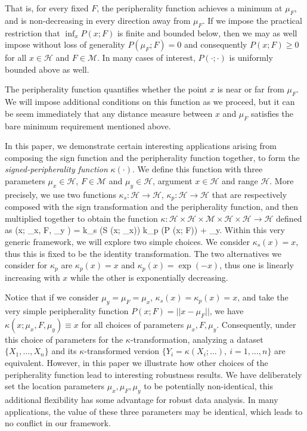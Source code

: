 \documentclass[12pt,letterpaper]{article}
\newcommand{\cH}{\mathcal{H}}
\newcommand{\cM}{\mathcal{M}}
\def\ban#1\ean{\begin{align*}#1\end{align*}}
\theoremstyle{Example}
\begin{document}
That is, for every fixed $F$, the peripherality function achieves a minimum at 
$\mu_{F}$, and is non-decreasing in every direction away from $\mu_{F}$. If 
we impose the practical restriction that $\inf_{x} P ( x ; F )$ is finite and 
bounded below, then we may as well impose without loss of generality 
$P ( \mu_{F} ; F ) = 0$ and consequently $P ( x ; F ) \geq 0$ for all $x \in \cH$ 
and  $F \in \cM$. In many cases of interest, $P ( \cdot; \cdot)$ is 
uniformly bounded above as well.


The peripherality function quantifies whether the point $x$ is near or far from $\mu_{F}$. 
We will impose additional conditions on this function 
as we proceed, but it can be seem immediately that any distance measure between 
$x$ and $\mu_{F}$ satisfies the bare minimum requirement mentioned above. 


In this paper, we demonstrate certain interesting applications arising from 
composing the sign function and the peripherality function together, to form the 
{\it signed-peripherality function} $\kappa (\cdot)$. We define this function 
with three parameters $\mu_{x} \in \cH$, $F \in \cM$ and  
$\mu_{y} \in \cH$,  argument $x \in \cH$ and range $\cH$. More precisely,
we use two functions $\kappa_{s} : \cH \rightarrow \cH$, 
$\kappa_{p} : \cH \rightarrow \cH$ that are respectively 
composed with the sign transformation and the peripherality function, and 
then multiplied together to obtain the function
$\kappa : \cH \times \cH \times \cM \times \cH \times \cH \rightarrow \cH$ 
defined as 
\ban 
\kappa (x; \mu_{x}, F, \mu_{y} ) = k_{s} (S (x; \mu_{x})) k_{p} (P (x; F)) + \mu_{y}. 
\ean
Within this very generic framework, we will explore two simple choices. We consider 
$\kappa_{s} (x) = x$, thus this is fixed to be the identity transformation. The two 
alternatives we consider for $\kappa_{p}$ are 
$\kappa_{p} (x) = x$ and $\kappa_{p} (x) = \exp (- x)$, thus one is linearly 
increasing with $x$ while the other is exponentially decreasing.


Notice that if we consider $\mu_{y} = \mu_{F} = \mu_{x}$,  
$\kappa_{s} (x) = \kappa_{p} (x) = x$, and take the very 
simple peripherality  function $P( x; F) = || x - \mu_{F} ||$, we have 
$\kappa (x; \mu_{x}, F, \mu_{y} ) \equiv x$ for all choices of parameters 
$\mu_{x}, F, \mu_{y}$.  Consequently, under this choice of parameters for the 
$\kappa$-transformation, analyzing a dataset $\{ X_{1}, \ldots, X_{n} \}$ and 
its $\kappa$-transformed version 
$\{ Y_{i} = \kappa (X_{i}; \ldots), \ i = 1, \ldots, n \}$ are equivalent. However,
in this paper we illustrate how other choices of the peripherality function 
lead to interesting robustness results. We have deliberately set the location 
parameters $\mu_{x}, \mu_{F}, \mu_{y}$ to be potentially non-identical, this 
additional flexibility has some advantage for robust data analysis. In many 
applications, the value of these three parameters may be identical, which leads 
to no conflict in our framework.
\end{document}
